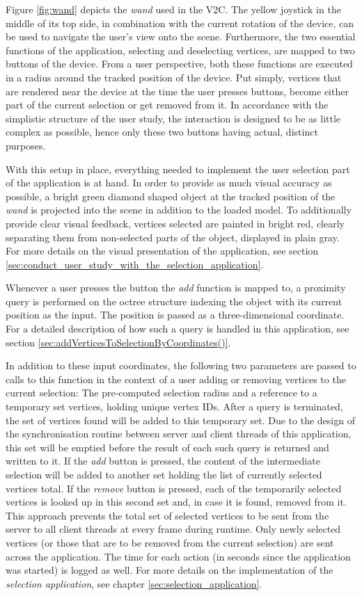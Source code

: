 Figure \ref{fig:wand} depicts the \textit{wand} used in the V2C. The yellow joystick in the middle of its top side, in combination with the current rotation of the device, can be used to navigate the user's view onto the scene. Furthermore, the two essential functions of the application, selecting and deselecting vertices, are mapped to two buttons of the device. From a user perspective, both these functions are executed in a radius around the tracked position of the device. Put simply, vertices that are rendered near the device at the time the user presses buttons, become either part of the current selection or get removed from it. In accordance with the simplistic structure of the user study, the interaction is designed to be as little complex as possible, hence only these two buttons having actual, distinct purposes. 

With this setup in place, everything needed to implement the user selection part of the application is at hand. In order to provide as much visual accuracy as possible, a bright green diamond shaped object at the tracked position of the \textit{wand} is projected into the scene in addition to the loaded model. To additionally provide clear visual feedback, vertices selected are painted in bright red, clearly separating them from non-selected parts of the object, displayed in plain gray. For more details on the visual presentation of the application, see section \ref{sec:conduct_user_study_with_the_selection_application}.

Whenever a user presses the button the \textit{add} function is mapped to, a proximity query is performed on the octree structure indexing the object with its current position as the input. The position is passed as a three-dimensional coordinate. For a detailed description of how such a query is handled in this application, see section \ref{sec:addVerticesToSelectionByCoordinates()}.

In addition to these input coordinates, the following two parameters are passed to calls to this function in the context of a user adding or removing vertices to the current selection: The pre-computed selection radius and a reference to a temporary set vertices, holding unique vertex IDs. After a query is terminated, the set of vertices found will be added to this temporary set. Due to the design of the synchronisation routine between server and client threads of this application, this set will be emptied before the result of each such query is returned and written to it. If the \textit{add} button is pressed, the content of the intermediate selection will be added to another set holding the list of currently selected vertices total. If the \textit{remove} button is pressed, each of the temporarily selected vertices is looked up in this second set and, in case it is found, removed from it. This approach prevents the total set of selected vertices to be sent from the server to all client threads at every frame during runtime. Only newly selected vertices (or those that are to be removed from the current selection) are sent across the application. The time for each action (in seconds since the application was started) is logged as well. For more details on the implementation of the \textit{selection application}, see chapter \ref{sec:selection_application}.

